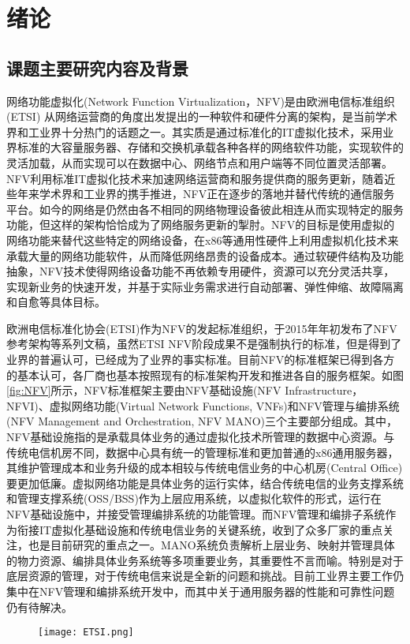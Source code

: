 \chapter{绪论}
\label{chap: Introduction}
\section{课题主要研究内容及背景}
网络功能虚拟化(Network Function Virtualization，NFV)是由欧洲电信标准组织 (ETSI) 从网络运营商的角度出发提出的一种软件和硬件分离的架构，是当前学术界和工业界十分热门的话题之一。其实质是通过标准化的IT虚拟化技术，采用业界标准的大容量服务器、存储和交换机承载各种各样的网络软件功能，实现软件的灵活加载，从而实现可以在数据中心、网络节点和用户端等不同位置灵活部署。NFV利用标准IT虚拟化技术来加速网络运营商和服务提供商的服务更新，随着近些年来学术界和工业界的携手推进，NFV正在逐步的落地并替代传统的通信服务平台。如今的网络是仍然由各不相同的网络物理设备彼此相连从而实现特定的服务功能，但这样的架构恰恰成为了网络服务更新的掣肘。NFV的目标是使用虚拟的网络功能来替代这些特定的网络设备，在x86等通用性硬件上利用虚拟机化技术来承载大量的网络功能软件，从而降低网络昂贵的设备成本。通过软硬件结构及功能抽象，NFV技术使得网络设备功能不再依赖专用硬件，资源可以充分灵活共享，实现新业务的快速开发，并基于实际业务需求进行自动部署、弹性伸缩、故障隔离和自愈等具体目标\cite{etsi2013001}。

欧洲电信标准化协会(ETSI)作为NFV的发起标准组织，于2015年年初发布了NFV参考架构等系列文稿，虽然ETSI NFV阶段成果不是强制执行的标准，但是得到了业界的普遍认可，已经成为了业界的事实标准。目前NFV的标准框架已得到各方的基本认可，各厂商也基本按照现有的标准架构开发和推进各自的服务框架。如图\ref{fig:NFV}所示，NFV标准框架主要由NFV基础设施(NFV Infrastructure，NFVI)、虚拟网络功能(Virtual Network Functions, VNFs)和NFV管理与编排系统(NFV Management and Orchestration, NFV MANO)三个主要部分组成。其中，NFV基础设施指的是承载具体业务的通过虚拟化技术所管理的数据中心资源。与传统电信机房不同，数据中心具有统一的管理标准和更加普通的x86通用服务器，其维护管理成本和业务升级的成本相较与传统电信业务的中心机房(Central Office)要更加低廉。虚拟网络功能是具体业务的运行实体，结合传统电信的业务支撑系统和管理支撑系统(OSS/BSS)作为上层应用系统，以虚拟化软件的形式，运行在NFV基础设施中，并接受管理编排系统的功能管理。而NFV管理和编排子系统作为衔接IT虚拟化基础设施和传统电信业务的关键系统，收到了众多厂家的重点关注，也是目前研究的重点之一。MANO系统负责解析上层业务、映射并管理具体的物力资源、编排具体业务系统等多项重要业务，其重要性不言而喻。特别是对于底层资源的管理，对于传统电信来说是全新的问题和挑战。目前工业界主要工作仍集中在NFV管理和编排系统开发中，而其中关于通用服务器的性能和可靠性问题仍有待解决。
\begin{figure}[!htp]
	\centering
	\texttt{[image: ETSI.png]}
\end{figure}

